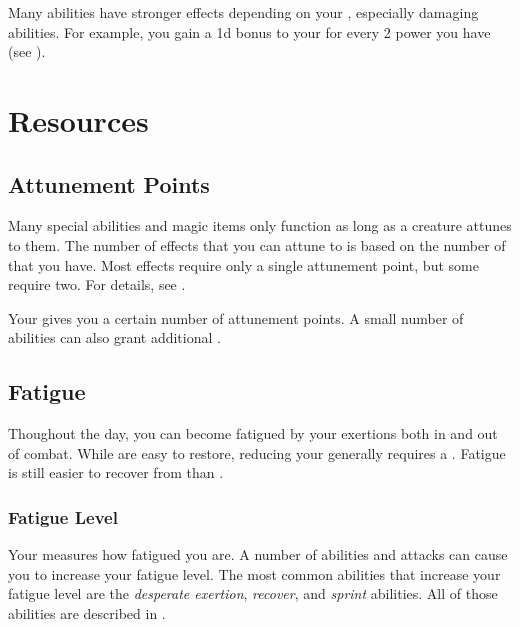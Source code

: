         Many abilities have stronger effects depending on your , especially damaging abilities.
        For example, you gain a \plus1d bonus to your  for every 2 power you have (see ).

\section{Resources}\label{Resources}

    \subsection{Attunement Points}\label{Attunement Points}
        Many special abilities and magic items only function as long as a creature attunes to them.
        The number of effects that you can attune to is based on the number of  that you have.
        Most effects require only a single attunement point, but some require two.
        For details, see .

        Your  gives you a certain number of attunement points.
        A small number of abilities can also grant additional .

    \subsection{Fatigue}\label{Fatigue}
        Thoughout the day, you can become fatigued by your exertions both in and out of combat.
        While  are easy to restore, reducing your  generally requires a .
        Fatigue is still easier to recover from than .

        \subsubsection{Fatigue Level}\label{Fatigue Level}
            Your  measures how fatigued you are.
            A number of abilities and attacks can cause you to increase your fatigue level.
            The most common abilities that increase your fatigue level are the \textit{desperate exertion}, \textit{recover}, and \textit{sprint} abilities.
            All of those abilities are described in .

